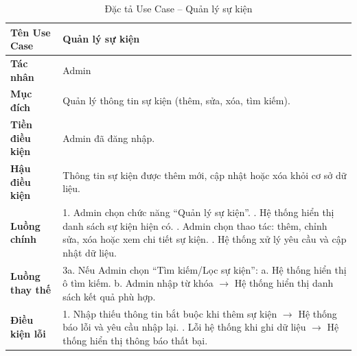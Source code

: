 \begin{table}[H]
\centering
\renewcommand{\arraystretch}{1.3}
\setlength{\tabcolsep}{8pt}
\begin{tabularx}{\textwidth}{|l|X|}
\hline
\textbf{Tên Use Case} & Quản lý sự kiện \\ \hline
\textbf{Tác nhân} & Admin \\ \hline
\textbf{Mục đích} & Quản lý thông tin sự kiện (thêm, sửa, xóa, tìm kiếm). \\ \hline
\textbf{Tiền điều kiện} & Admin đã đăng nhập. \\ \hline
\textbf{Hậu điều kiện} & Thông tin sự kiện được thêm mới, cập nhật hoặc xóa khỏi cơ sở dữ liệu. \\ \hline
\textbf{Luồng chính} &
1. Admin chọn chức năng “Quản lý sự kiện”. \newline
2. Hệ thống hiển thị danh sách sự kiện hiện có. \newline
3. Admin chọn thao tác: thêm, chỉnh sửa, xóa hoặc xem chi tiết sự kiện. \newline
4. Hệ thống xử lý yêu cầu và cập nhật dữ liệu. \\ \hline
\textbf{Luồng thay thế} &
3a. Nếu Admin chọn “Tìm kiếm/Lọc sự kiện”: \newline
\hspace*{1em}a. Hệ thống hiển thị ô tìm kiếm. \newline
\hspace*{1em}b. Admin nhập từ khóa $\rightarrow$ Hệ thống hiển thị danh sách kết quả phù hợp. \\ \hline
\textbf{Điều kiện lỗi} &
1. Nhập thiếu thông tin bắt buộc khi thêm sự kiện $\rightarrow$ Hệ thống báo lỗi và yêu cầu nhập lại. \newline
2. Lỗi hệ thống khi ghi dữ liệu $\rightarrow$ Hệ thống hiển thị thông báo thất bại. \\ \hline
\end{tabularx}
\vspace{15pt}
\caption{Đặc tả Use Case -- Quản lý sự kiện}
\label{tab:uc_manage_event}
\end{table}


